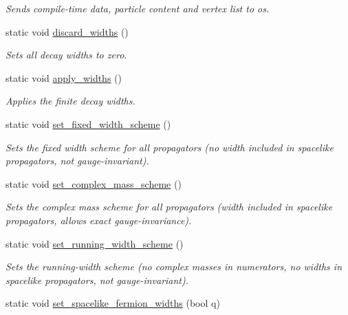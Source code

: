 \begin{DoxyCompactItemize}
\begin{DoxyCompactList}\small\item\em Sends compile-\/time data, particle content and vertex list to os. \end{DoxyCompactList}\item 
\hypertarget{a00372_a387b2e149ddb4ee519fea4d7ce2dc8f9}{}static void \hyperlink{a00372_a387b2e149ddb4ee519fea4d7ce2dc8f9}{discard\+\_\+widths} ()\label{a00372_a387b2e149ddb4ee519fea4d7ce2dc8f9}

\begin{DoxyCompactList}\small\item\em Sets all decay widths to zero. \end{DoxyCompactList}\item 
\hypertarget{a00372_a80902416868d9ee4d19979b8386fd433}{}static void \hyperlink{a00372_a80902416868d9ee4d19979b8386fd433}{apply\+\_\+widths} ()\label{a00372_a80902416868d9ee4d19979b8386fd433}

\begin{DoxyCompactList}\small\item\em Applies the finite decay widths. \end{DoxyCompactList}\item 
static void \hyperlink{a00372_a89e70b576cf3cb5e345bd3252dc01373}{set\+\_\+fixed\+\_\+width\+\_\+scheme} ()
\begin{DoxyCompactList}\small\item\em Sets the fixed width scheme for all propagators (no width included in spacelike propagators, not gauge-\/invariant). \end{DoxyCompactList}\item 
static void \hyperlink{a00372_abf489c248710fb84d0642590b1023db9}{set\+\_\+complex\+\_\+mass\+\_\+scheme} ()
\begin{DoxyCompactList}\small\item\em Sets the complex mass scheme for all propagators (width included in spacelike propagators, allows exact gauge-\/invariance). \end{DoxyCompactList}\item 
static void \hyperlink{a00372_adf237ebf4d679ef7cb395d15617a5b5b}{set\+\_\+running\+\_\+width\+\_\+scheme} ()
\begin{DoxyCompactList}\small\item\em Sets the running-\/width scheme (no complex masses in numerators, no widths in spacelike propagators, not gauge-\/invariant). \end{DoxyCompactList}\item 
\hypertarget{a00372_a788b430717c5cadaa9ffe32dc8bf20a2}{}static void \hyperlink{a00372_a788b430717c5cadaa9ffe32dc8bf20a2}{set\+\_\+spacelike\+\_\+fermion\+\_\+widths} (bool q)\label{a00372_a788b430717c5cadaa9ffe32dc8bf20a2}


\end{DoxyCompactItemize}
